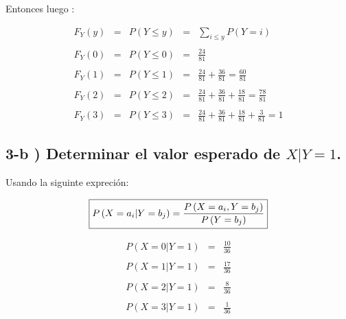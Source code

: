 \documentclass[12pt]{article}
\begin{document}
Entonces luego :

\begin{equation*}
    \begin{array}{rcccl}
        F_Y\left(y\right) & = & P\left(Y \leq y\right)
                         & = & \displaystyle \sum_{i\leq y} P\left(Y=i\right)
        \\
        \\
        F_Y\left(0\right) & = & P\left(Y\leq0\right)        & = & \displaystyle \frac{24}{81}
        \\
        \\
        F_Y\left(1\right) & = & P\left(Y\leq1\right)        & = & \displaystyle \frac{24}{81} + \frac{36}{81} = \frac{60}{81}
        \\
        \\
        F_Y\left(2\right) & = & P\left(Y\leq2\right)        & = & \displaystyle \frac{24}{81} + \frac{36}{81} + \frac{18}{81} = \frac{78}{81}
        \\
        \\
        F_Y\left(3\right) & = & P\left(Y\leq3\right)        & = & \displaystyle \frac{24}{81} + \frac{36}{81} + \frac{18}{81} + \frac{3}{81}  = 1
    \end{array}
\end{equation*}


\subsection*{ 3-b ) Determinar el valor esperado de $ X|Y = 1$.}

Usando la  siguinte expreci\'on:


\begin{equation*}
    \fbox{$
    \displaystyle P\left(X = a_i|Y = b_j\right)  =  \frac{P\left(X = a_i,Y = b_j\right)}{P\left(Y = b_j\right)}
    $}
\end{equation*}

\begin{equation*}
    \begin{array}{rcl}
        P\left(X = 0|Y = 1\right) & = & \displaystyle \frac{10}{36}
        \\
        \\
        P\left(X = 1|Y = 1\right) & = & \displaystyle \frac{17}{36}
        \\
        \\
        P\left(X = 2|Y = 1\right) & = & \displaystyle \frac{8}{36}
        \\
        \\
        P\left(X = 3|Y = 1\right) & = & \displaystyle \frac{1}{36}
    \end{array}
\end{equation*}
\end{document}
